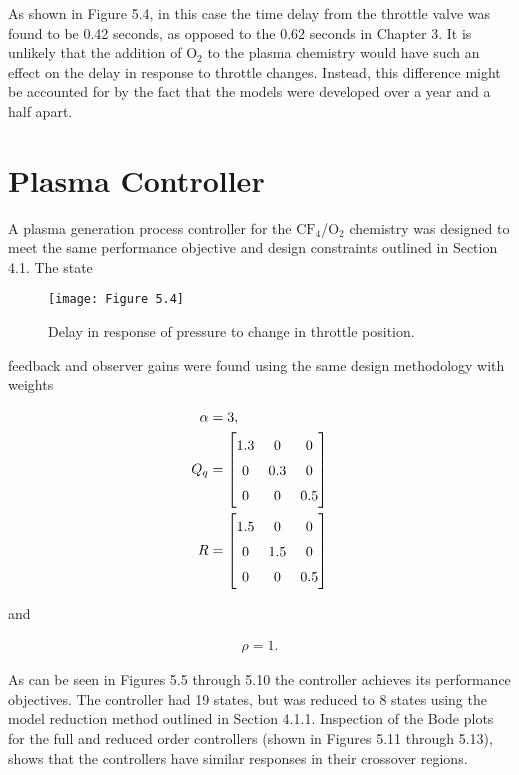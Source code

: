 \noindent As shown in Figure 5.4, in this case the time delay from the throttle valve was found to be
0.42 seconds, as opposed to the 0.62 seconds in Chapter 3. It is unlikely that the addition
of $\text{O}_{2}$ to the plasma chemistry would have such an effect on the delay in response to throttle
changes. Instead, this difference might be accounted for by the fact that the models were
developed over a year and a half apart.

\section{Plasma Controller}

\tab A plasma generation process controller for the $\text{CF}_{4}$/$\text{O}_{2}$ chemistry was designed to meet the same performance objective and design constraints outlined in Section 4.1. The state

\begin{figure}[H]
	\centering
	\texttt{[image: Figure 5.4]}
	\bf\caption{  Delay in response of pressure to change in throttle position.}
	\label{fig:5.4}
\end{figure}

\noindent feedback and observer gains were found using the same design methodology with weights

\begin{align}
	\alpha &= 3, \\
	Q_{q} &= \renewcommand\arraystretch{1.5} \begin{bmatrix}
		1.3 & 0 & 0 \\ 0 & 0.3 & 0 \\ 0 & 0 & 0.5
	\end{bmatrix} \\
	R &= \renewcommand\arraystretch{1.5} \begin{bmatrix}
		1.5 & 0 & 0 \\ 0 & 1.5 & 0 \\ 0 & 0 & 0.5
	\end{bmatrix}
\end{align}

\noindent and

\begin{align}
	\rho = 1.
\end{align}

As can be seen in Figures 5.5 through 5.10 the controller achieves its performance objectives.
The controller had 19 states, but was reduced to 8 states using the model reduction method
outlined in Section 4.1.1. Inspection of the Bode plots for the full and reduced order controllers (shown in Figures 5.11 through 5.13), shows that the controllers have similar responses in their crossover regions.

